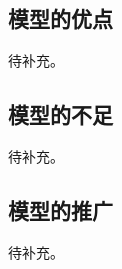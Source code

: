 \subsection{模型的优点}\label{sub:7.1}

待补充。

\subsection{模型的不足}\label{sub:7.2}

待补充。

\subsection{模型的推广}\label{sub:7.3}

待补充。

